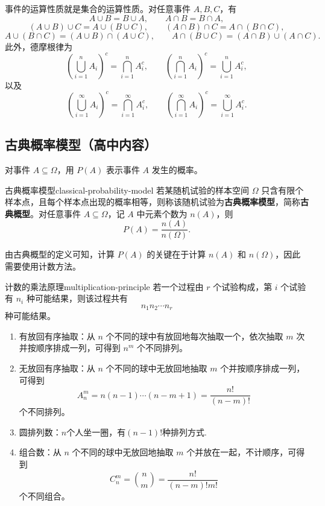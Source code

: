 事件的运算性质就是集合的运算性质。对任意事件 $A,B,C$，有
\[
A\cup B=B\cup A,\qquad A\cap B=B\cap A,
\]
\[
(A\cup B)\cup C=A\cup(B\cup C),\qquad
(A\cap B)\cap C=A\cap(B\cap C),
\]
\[
A\cup(B\cap C)=(A\cup B)\cap(A\cup C),\qquad
A\cap(B\cup C)=(A\cap B)\cup(A\cap C).
\]
此外，德摩根律为
\[
\left(\bigcup_{i=1}^{n}A_i\right)^c=\bigcap_{i=1}^{n}A_i^c,
\qquad
\left(\bigcap_{i=1}^{n}A_i\right)^c=\bigcup_{i=1}^{n}A_i^c,
\]
以及
\[
\left(\bigcup_{i=1}^{\infty}A_i\right)^c=\bigcap_{i=1}^{\infty}A_i^c,
\qquad
\left(\bigcap_{i=1}^{\infty}A_i\right)^c=\bigcup_{i=1}^{\infty}A_i^c.
\]

\subsection*{古典概率模型（高中内容）}

对事件 $A\subseteq\Omega$，用 $P(A)$ 表示事件 $A$ 发生的概率。

\begin{mydefinition}{古典概率模型}{classical-probability-model}
若某随机试验的样本空间 $\Omega$ 只含有限个样本点，且每个样本点出现的概率相等，则称该随机试验为\textbf{古典概率模型}，简称\textbf{古典概型}。对任意事件 $A\subseteq\Omega$，记 $A$ 中元素个数为 $n(A)$，则
\[
P(A)=\dfrac{n(A)}{n(\Omega)}.
\]
\end{mydefinition}

由古典概型的定义可知，计算 $P(A)$ 的关键在于计算 $n(A)$ 和 $n(\Omega)$，因此需要使用计数方法。

\begin{proposition}{计数的乘法原理}{multiplication-principle}
若一个过程由 $r$ 个试验构成，第 $i$ 个试验有 $n_i$ 种可能结果，则该过程共有
\[
n_1n_2\cdots n_r
\]
种可能结果。
\end{proposition}
\begin{example}
	\begin{enumerate}
		\item 有放回有序抽取：从 $n$ 个不同的球中有放回地每次抽取一个，依次抽取 $m$ 次并按顺序排成一列，可得到 $n^m$ 个不同排列。
		\item 无放回有序抽取：从 $n$ 个不同的球中无放回地抽取 $m$ 个并按顺序排成一列，可得到
		\[
		A_n^m=n(n-1)\cdots(n-m+1)=\dfrac{n!}{(n-m)!}
		\]
		个不同排列。
		\item 圆排列数：$n$个人坐一圈，有$(n-1)!$种排列方式.
		\item 组合数：从 $n$ 个不同的球中无放回地抽取 $m$ 个并放在一起，不计顺序，可得到
		\[
		C_n^m=\binom{n}{m}=\dfrac{n!}{(n-m)!m!}
		\]
		个不同组合。
	\end{enumerate}
\end{example}

